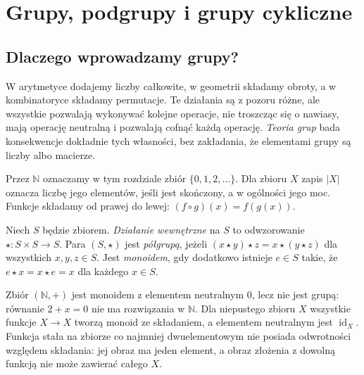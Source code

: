 \chapter{Grupy, podgrupy i grupy cykliczne}
\label{aa:ch:grupy}

\section{Dlaczego wprowadzamy grupy?}
W arytmetyce dodajemy liczby całkowite, w geometrii składamy obroty,
a w kombinatoryce składamy permutacje. Te działania są z pozoru różne,
ale wszystkie pozwalają wykonywać kolejne operacje, nie troszcząc się
o nawiasy, mają operację neutralną i pozwalają cofnąć każdą operację.
\emph{Teoria grup} bada konsekwencje dokładnie tych własności, bez
zakładania, że elementami grupy są liczby albo macierze.

Przez $\mathbb N$ oznaczamy w tym rozdziale zbiór $\{0,1,2,\ldots\}$.
Dla zbioru $X$ zapis $|X|$ oznacza liczbę jego elementów, jeśli jest skończony,
a w ogólności jego moc. Funkcje składamy od prawej do lewej:
$(f\circ g)(x)=f(g(x))$.

\begin{definicja}
\label{aa:def:operacje}
Niech $S$ będzie zbiorem. \emph{Działanie wewnętrzne} na $S$ to
odwzorowanie $\star:S\times S\to S$. Para $(S,\star)$ jest
\emph{półgrupą}, jeżeli $(x\star y)\star z=x\star(y\star z)$
dla wszystkich $x,y,z\in S$. Jest \emph{monoidem}, gdy dodatkowo
istnieje $e\in S$ takie, że $e\star x=x\star e=x$ dla każdego $x\in S$.
\end{definicja}

\begin{przyklad}
\label{aa:prz:monoidy}
Zbiór $(\mathbb N,+)$ jest monoidem z elementem neutralnym $0$,
lecz nie jest grupą: równanie $2+x=0$ nie ma rozwiązania w $\mathbb N$.
Dla niepustego zbioru $X$ wszystkie funkcje $X\to X$ tworzą monoid
ze składaniem, a elementem neutralnym jest $\operatorname{id}_X$.
Funkcja stała na zbiorze co najmniej dwuelementowym nie posiada
odwrotności względem składania: jej obraz ma jeden element,
a obraz złożenia z dowolną funkcją nie może zawierać całego $X$.
\end{przyklad}


